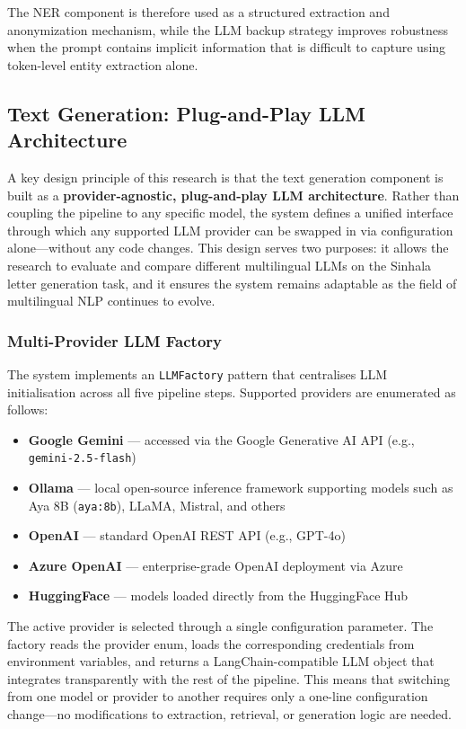 \documentclass[12pt]{uomthesis}
\begin{document}
The NER component is therefore used as a structured extraction and anonymization mechanism, while the LLM backup strategy improves robustness when the prompt contains implicit information that is difficult to capture using token-level entity extraction alone.

\subsection{Text Generation: Plug-and-Play LLM Architecture}

A key design principle of this research is that the text generation component is built as a \textbf{provider-agnostic, plug-and-play LLM architecture}. Rather than coupling the pipeline to any specific model, the system defines a unified interface through which any supported LLM provider can be swapped in via configuration alone—without any code changes. This design serves two purposes: it allows the research to evaluate and compare different multilingual LLMs on the Sinhala letter generation task, and it ensures the system remains adaptable as the field of multilingual NLP continues to evolve.

\subsubsection{Multi-Provider LLM Factory}

The system implements an \texttt{LLMFactory} pattern that centralises LLM initialisation across all five pipeline steps. Supported providers are enumerated as follows:

\begin{itemize}
    \item \textbf{Google Gemini} — accessed via the Google Generative AI API (e.g., \texttt{gemini-2.5-flash})
    \item \textbf{Ollama} — local open-source inference framework supporting models such as Aya 8B (\texttt{aya:8b}), LLaMA, Mistral, and others
    \item \textbf{OpenAI} — standard OpenAI REST API (e.g., GPT-4o)
    \item \textbf{Azure OpenAI} — enterprise-grade OpenAI deployment via Azure
    \item \textbf{HuggingFace} — models loaded directly from the HuggingFace Hub
\end{itemize}

The active provider is selected through a single configuration parameter. The factory reads the provider enum, loads the corresponding credentials from environment variables, and returns a LangChain-compatible LLM object that integrates transparently with the rest of the pipeline. This means that switching from one model or provider to another requires only a one-line configuration change—no modifications to extraction, retrieval, or generation logic are needed.
\end{document}
